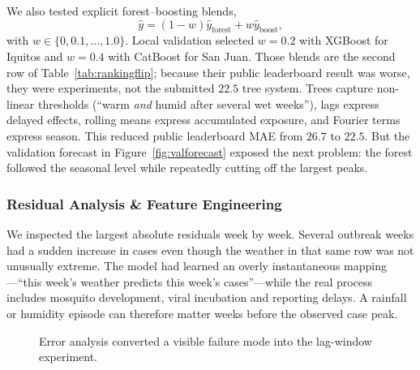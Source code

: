 \documentclass[11pt,a4paper]{article}
\begin{document}
We also tested explicit forest--boosting blends,
\begin{equation}
\hat y=(1-w)\hat y_{\mathrm{forest}}+w\hat y_{\mathrm{boost}},
\end{equation}
with $w\in\{0,0.1,\ldots,1.0\}$. Local validation selected $w=0.2$ with XGBoost for Iquitos and $w=0.4$ with CatBoost for San Juan. Those blends are the second row of Table~\ref{tab:rankingflip}; because their public leaderboard result was worse, they were experiments, not the submitted $22.5$ tree system.
Trees capture non-linear thresholds (``warm \emph{and} humid after several wet weeks''), lags express delayed effects, rolling means express accumulated exposure, and Fourier terms express season. This reduced public leaderboard MAE from $26.7$ to $22.5$. But the validation forecast in Figure~\ref{fig:valforecast} exposed the next problem: the forest followed the seasonal level while repeatedly cutting off the largest peaks.

\subsubsection*{Residual Analysis \& Feature Engineering}
We inspected the largest absolute residuals week by week. Several outbreak weeks had a sudden increase in cases even though the weather in that same row was not unusually extreme. The model had learned an overly instantaneous mapping---``this week's weather predicts this week's cases''---while the real process includes mosquito development, viral incubation and reporting delays. A rainfall or humidity episode can therefore matter weeks before the observed case peak.

\begin{figure}[H]
\centering
{}
\caption{Error analysis converted a visible failure mode into the lag-window experiment.}
\label{fig:errorlogic}
\end{figure}
\end{document}
